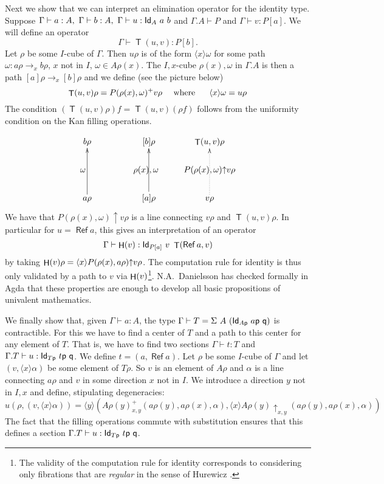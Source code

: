 \documentclass[10pt,a4paper]{article}
\DeclareMathOperator{\Ref}{\mathsf{Ref}}
\DeclareMathOperator{\Transp}{\mathsf{T}}
\DeclareMathOperator{\HH}{{\sf H}}
\newcommand{\Id}{{\sf Id}}
\newcommand{\pp}{{\sf p}}
\newcommand{\qq}{{\sf q}}
\newcommand{\rup}[1]{#1{\uparrow}}
\newcommand{\rupxy}[1]{#1{\uparrow_{x,y}}}
\newcommand{\bind}[2]{{\langle}#1{\rangle}#2}
\begin{document}
Next we show that we can interpret an elimination operator for the
identity type.  Suppose $\Gamma\vdash a:A,~\Gamma\vdash
b:A,~\Gamma\vdash u:\Id_A~a~b$ and $\Gamma.A\vdash P$ and
$\Gamma\vdash v:P[a]$. We will define an operator
$$
\Gamma\vdash \Transp(u,v):P[b].
$$
Let $\rho$ be some $I$-cube of $\Gamma$. Then $u\rho$ is of the form
$\bind{x}{\omega}$ for some path $\omega:a\rho\to _x b\rho$, $x$ not
in $I$, $\omega\in A\rho(x)$.  The $I,x$-cube $\rho (x),\omega$ in
$\Gamma.A$ is then a path $[a]\rho\to _x [b]\rho$ and we define (see
the picture below)
$$
\Transp(u,v)\rho = P(\rho (x),\omega)^+ v\rho~~~~{\rm where~~~~~}\bind{x}{\omega} = u\rho
$$
The condition $(\Transp(u,v)\rho)f = \Transp(u,v)(\rho f)$ follows from the
uniformity condition on the Kan filling operations.

\[
\xymatrix@R=.6cm@C=.6cm{
b\rho                 &&[b]\rho                    &   \Transp(u,v)\rho                                 \\
\omega ~~~     &&\rho(x),\omega~~  &\rup{P(\rho(x),\omega)} v\rho \\
a\rho\ar[uu]      &&[a]\rho\ar[uu]       &   v\rho\ar@{.>}[uu]                        \\
}
\]
We have that $\rup{P(\rho(x),\omega)} v\rho$ is a line connecting
$v\rho$ and $\Transp(u,v)\rho$.  In particular for $u=\Ref a$, this gives
an interpretation of an operator
$$
\Gamma\vdash \HH(v):\Id_{P[a]}~v~\Transp(\Ref a,v)
$$
by taking $\HH(v)\rho = \bind{x}{\rup{P(\rho (x),a\rho)} v\rho}$.  The
computation rule for identity is thus only validated by a path to $v$
via $\HH(v)$\footnote{The validity of the computation rule for
  identity corresponds to considering only fibrations that are {\em
    regular} in the sense of Hurewicz \cite{hurewicz}.}.
N.A.~Danielsson has checked formally in Agda that these properties are
enough to develop all basic propositions of univalent mathematics.


We finally show that, given $\Gamma\vdash a:A$, the type $\Gamma
\vdash T = \Sigma~A~(\Id_{A\pp}~a\pp~\qq)$ is contractible. For this
we have to find a center of $T$ and a path to this center for any
element of $T$.  That is, we have to find two sections $\Gamma\vdash
t:T$ and $\Gamma.T\vdash u:\Id_{T\pp}~t\pp~\qq$.  We define $t =
(a,\Ref a)$. Let $\rho$ be some $I$-cube of $\Gamma$ and let
$(v,\bind{x}{\alpha})$ be some element of $T\rho$. So $v$ is an
element of $A\rho$ and $\alpha$ is a line connecting $a\rho$ and $v$
in some direction $x$ not in $I$. We introduce a direction $y$ not in
$I,x$ and define, stipulating degeneracies:
$$
u(\rho,(v,\bind{x}{\alpha})) = \bind{y}{(A\rho(y)^+ _{x,y}
  (a\rho(y),a\rho(x),\alpha),\bind{x}{\rupxy{A\rho(y)}
    (a\rho(y),a\rho(x),\alpha)})}
$$
The fact that the filling operations commute with substitution ensures
that this defines a section $\Gamma.T\vdash u:\Id_{T\pp}~t\pp~\qq$.
\end{document}

